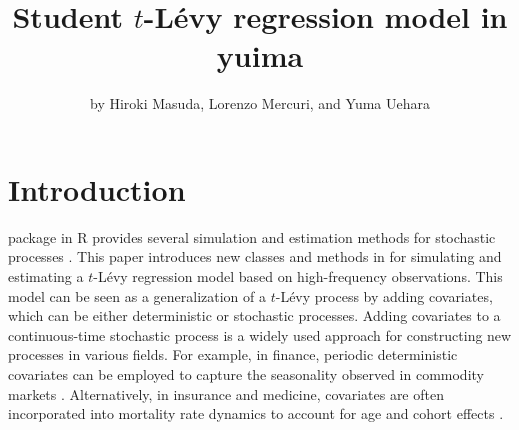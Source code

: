 \title{Student \(t\)-Lévy regression model in yuima}


\author{by Hiroki Masuda, Lorenzo Mercuri, and Yuma Uehara}

\maketitle


\section{Introduction}\label{Intro}

 package in R provides several simulation and estimation methods for stochastic processes \citep{YUIMA, JSSv057i04, iacus2018simulation}.
This paper introduces new classes and methods in  for simulating and estimating a \(t\)-Lévy regression model based on high-frequency observations. This model can be seen as a generalization of a \(t\)-Lévy process \citep{HeyLeo05, Cuf07} by adding covariates, which can be either deterministic or stochastic processes.
Adding covariates to a continuous-time stochastic process is a widely used approach for constructing new processes in various fields. For example, in finance, periodic deterministic covariates can be employed to capture the seasonality observed in commodity markets \citep{sorensen2002modeling}. Alternatively, in insurance and medicine, covariates are often incorporated into mortality rate dynamics to account for age and cohort effects \citep[see][ and references therein]{HABERMAN2009255, castro2021trends}.

